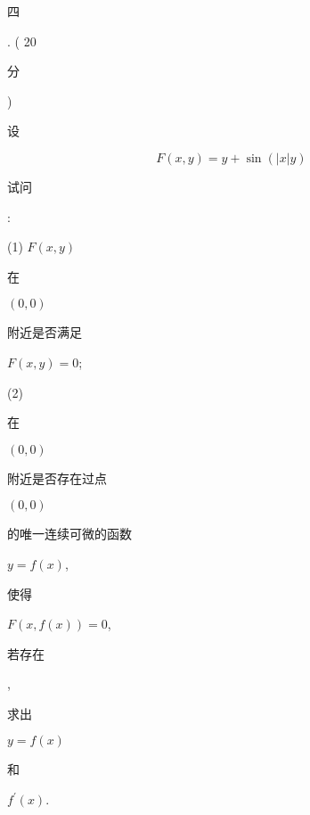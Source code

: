 \documentclass[10pt]{article}
\begin{document}
\begin{CJK}{UTF8}{mj}四\end{CJK}. ( 20 \begin{CJK}{UTF8}{mj}分\end{CJK}) \begin{CJK}{UTF8}{mj}设\end{CJK}
$$
F(x, y)=y+\sin (|x| y)
$$
\begin{CJK}{UTF8}{mj}试问\end{CJK}:

(1) $F(x, y)$ \begin{CJK}{UTF8}{mj}在\end{CJK} $(0,0)$ \begin{CJK}{UTF8}{mj}附近是否满足\end{CJK} $F(x, y)=0$;

(2) \begin{CJK}{UTF8}{mj}在\end{CJK} $(0,0)$ \begin{CJK}{UTF8}{mj}附近是否存在过点\end{CJK} $(0,0)$ \begin{CJK}{UTF8}{mj}的唯一连续可微的函数\end{CJK} $y=f(x)$, \begin{CJK}{UTF8}{mj}使得\end{CJK} $F(x, f(x))=0$, \begin{CJK}{UTF8}{mj}若存在\end{CJK}, \begin{CJK}{UTF8}{mj}求出\end{CJK} $y=f(x)$ \begin{CJK}{UTF8}{mj}和\end{CJK} $f^{\prime}(x)$.
\end{document}

